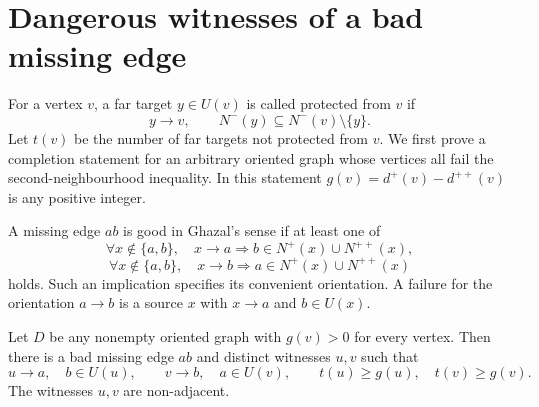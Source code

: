 \section{Dangerous witnesses of a bad missing edge}
\label{sec:dangerous-witnesses}

For a vertex $v$, a far target $y\in U(v)$ is called protected from
$v$ if
\[
 y\to v,\qquad N^-(y)\subseteq N^-(v)\setminus\{y\}.
\]
Let $t(v)$ be the number of far targets not protected from $v$.
We first prove a completion statement for an arbitrary oriented
graph whose vertices all fail the second-neighbourhood inequality.
In this statement $g(v)=d^+(v)-d^{++}(v)$ is any positive integer.

A missing edge $ab$ is good in Ghazal's sense \cite{Ghazal2012} if at least one of
\[
 \forall x\notin\{a,b\},\quad
 x\to a\Longrightarrow b\in N^+(x)\cup N^{++}(x),
\]
\[
 \forall x\notin\{a,b\},\quad
 x\to b\Longrightarrow a\in N^+(x)\cup N^{++}(x)
\]
holds. Such an implication specifies its convenient orientation.
A failure for the orientation $a\to b$ is a source $x$ with
$x\to a$ and $b\in U(x)$.

\begin{lemma}
\label{lem:dangerous-completion}
Let $D$ be any nonempty oriented graph with $g(v)>0$ for every vertex. Then
there is a bad missing edge $ab$ and distinct witnesses $u,v$ such that
\[
 u\to a,\quad b\in U(u),\qquad
 v\to b,\quad a\in U(v),
 \qquad t(u)\ge g(u),\quad t(v)\ge g(v).
\]
The witnesses $u,v$ are non-adjacent.
\end{lemma}

